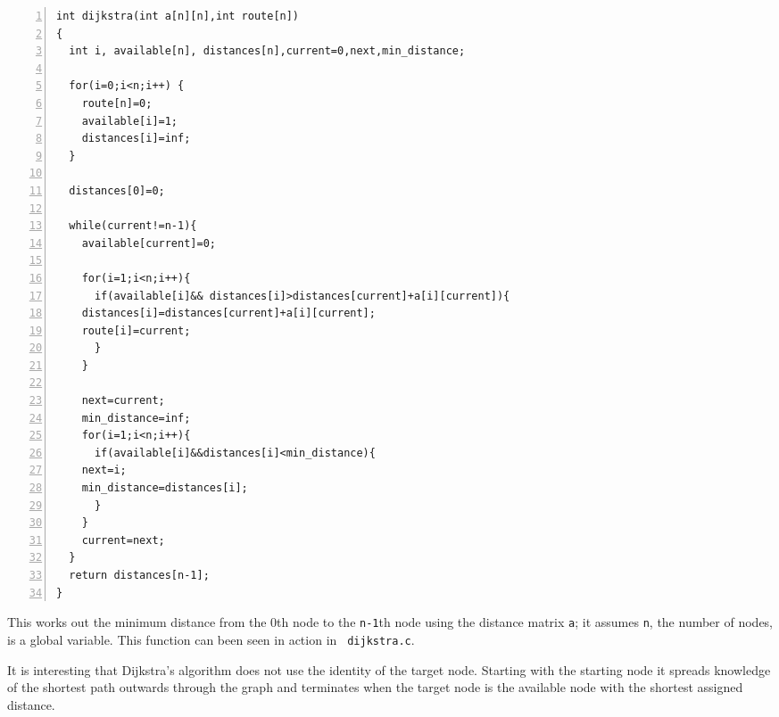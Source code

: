\documentclass[11pt,a4paper]{scrartcl}
\begin{document}
\begin{table}
\begin{lstlisting}[numbers=left]
int dijkstra(int a[n][n],int route[n])
{  
  int i, available[n], distances[n],current=0,next,min_distance;

  for(i=0;i<n;i++) {
    route[n]=0;
    available[i]=1;
    distances[i]=inf;
  }
  
  distances[0]=0;

  while(current!=n-1){
    available[current]=0;

    for(i=1;i<n;i++){
      if(available[i]&& distances[i]>distances[current]+a[i][current]){
	distances[i]=distances[current]+a[i][current];
	route[i]=current;
      }
    }
      
    next=current;
    min_distance=inf;
    for(i=1;i<n;i++){
      if(available[i]&&distances[i]<min_distance){
	next=i;
	min_distance=distances[i];
      }
    }
    current=next;
  }
  return distances[n-1];
} 
\end{lstlisting}
\caption{This works out the minimum distance from the 0th node to the \texttt{n-1}th node using the distance matrix \texttt{a}; it assumes \texttt{n}, the number of nodes, is a global variable. This function can been seen in action in \texttt{
    dijkstra.c}. \label{c_dijkstra}}
\end{table}

It is interesting that Dijkstra's algorithm does not use the identity
of the target node. Starting with the starting node it spreads
knowledge of the shortest path outwards through the graph and
terminates when the target node is the available node with the
shortest assigned distance.
\end{document}
